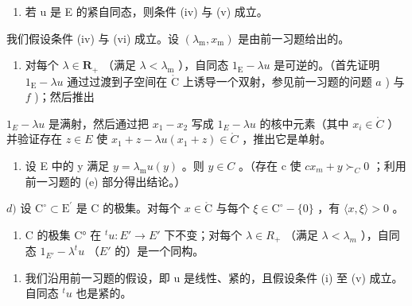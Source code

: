 \begin{enumerate}
\def\labelenumi{\alph{enumi})}
\tightlist
\item
  若 u 是 E 的紧自同态，则条件 (iv) 与 (v) 成立。
\end{enumerate}

我们假设条件 (iv) 与 (vi) 成立。设 \((\lambda_{\mathrm{m}}, x_{\mathrm{m}})\) 是由前一习题给出的。

\begin{enumerate}
\def\labelenumi{\alph{enumi})}
\setcounter{enumi}{1}
\tightlist
\item
  对每个 \(\lambda \in \mathbf{R}_{+}\) （满足 \(\lambda < \lambda_{\mathrm{m}}\) ），自同态 \(1_{\mathrm{E}} - \lambda u\) 是可逆的。（首先证明 \(1_{\mathrm{E}} - \lambda u\) 通过过渡到子空间在 \(\mathring{\mathrm{C}}\) 上诱导一个双射，参见前一习题的问题 \(a\) ) 与 \(f\) )；然后推出
\end{enumerate}

\(1_{E} - \lambda u\) 是满射，然后通过把 \(x_{1} - x_{2}\) 写成 \(1_{E} - \lambda u\) 的核中元素（其中 \(x_{i} \in \mathring{C}\) ）并验证存在 \(z \in E\) 使 \(x_{1} + z - \lambda u(x_{1} + z) \in \mathring{C}\) ，推出它是单射。

\begin{enumerate}
\def\labelenumi{\alph{enumi})}
\setcounter{enumi}{2}
\tightlist
\item
  设 E 中的 y 满足 \(y = \lambda_{\mathrm{m}} u(y)\) 。则 \(y \in C\) 。（存在 c 使 \(cx_{m} + y \succ_{C} 0\) ；利用前一习题的 (e) 部分得出结论。）
\end{enumerate}

\(d)\) 设 \(\mathrm{C}^{\circ}\subset\mathrm{E}^{\prime}\) 是 C 的极集。对每个 \(x\in\mathring{\mathrm{C}}\) 与每个 \(\xi\in\mathrm{C}^{\circ}-\{0\}\) ，有 \(\langle x,\xi\rangle>0\) 。

\begin{enumerate}
\def\labelenumi{\alph{enumi})}
\setcounter{enumi}{4}
\tightlist
\item
  C 的极集 C° 在 \(^{t}u\colon E'\to E'\) 下不变；对每个 \(\lambda\in R_{+}\) （满足 \(\lambda<\lambda_{m}\) ），自同态 \(1_{E'}-\lambda^{t}u\) （\(E'\) 的）是一个同构。
\end{enumerate}

\begin{enumerate}
\def\labelenumi{\arabic{enumi})}
\setcounter{enumi}{29}
\tightlist
\item
  我们沿用前一习题的假设，即 u 是线性、紧的，且假设条件 (i) 至 (v) 成立。自同态 \(^{t}u\) 也是紧的。
\end{enumerate}

